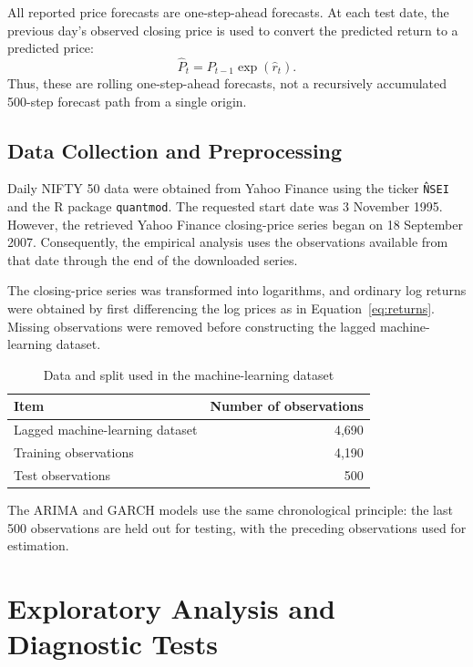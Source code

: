 \documentclass[10pt,a4paper]{article}
\begin{document}
All reported price forecasts are one-step-ahead forecasts. At each test date, the previous day's observed closing price is used to convert the predicted return to a predicted price:
\begin{equation}
  \widehat{P}_t=P_{t-1}\exp(\widehat{r}_t).
  \label{eq:price_reconstruction}
\end{equation}
Thus, these are rolling one-step-ahead forecasts, not a recursively accumulated 500-step forecast path from a single origin.

\subsection{Data Collection and Preprocessing}

Daily NIFTY 50 data were obtained from Yahoo Finance using the ticker \texttt{\^NSEI} and the R package \texttt{quantmod}. The requested start date was 3 November 1995. However, the retrieved Yahoo Finance closing-price series began on 18 September 2007. Consequently, the empirical analysis uses the observations available from that date through the end of the downloaded series.

The closing-price series was transformed into logarithms, and ordinary log returns were obtained by first differencing the log prices as in Equation~\eqref{eq:returns}. Missing observations were removed before constructing the lagged machine-learning dataset.

\begin{table}[H]
\centering
\caption{Data and split used in the machine-learning dataset}
\begin{tabular}{lr}
\toprule
Item & Number of observations \\
\midrule
Lagged machine-learning dataset & 4,690 \\
Training observations & 4,190 \\
Test observations & 500 \\
\bottomrule
\end{tabular}
\label{tab:data_split}
\end{table}

The ARIMA and GARCH models use the same chronological principle: the last 500 observations are held out for testing, with the preceding observations used for estimation.

\section{Exploratory Analysis and Diagnostic Tests}
\end{document}
